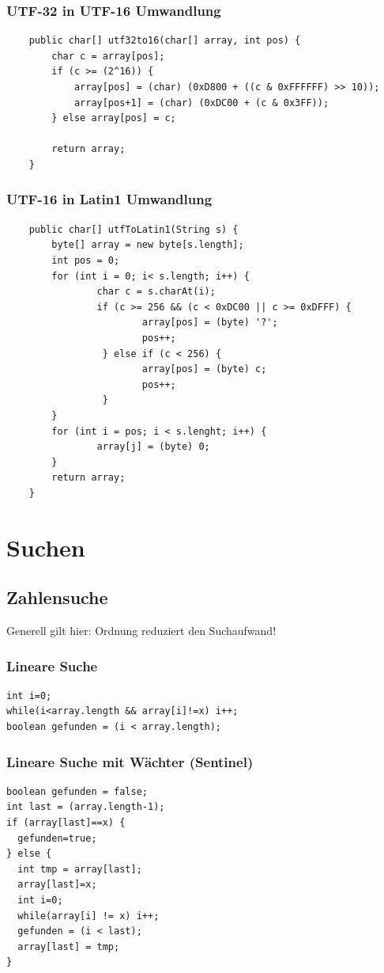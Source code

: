 \documentclass[a4paper,10pt]{article}
\begin{document}
\subsubsection{UTF-32 in UTF-16 Umwandlung}
\begin{lstlisting}
    public char[] utf32to16(char[] array, int pos) {
        char c = array[pos];
        if (c >= (2^16)) {
            array[pos] = (char) (0xD800 + ((c & 0xFFFFFF) >> 10));
            array[pos+1] = (char) (0xDC00 + (c & 0x3FF));
        } else array[pos] = c;
            
        return array;
    }
\end{lstlisting}

\subsubsection{UTF-16 in Latin1 Umwandlung}
\begin{lstlisting}
    public char[] utfToLatin1(String s) {
        byte[] array = new byte[s.length];
        int pos = 0;
        for (int i = 0; i< s.length; i++) {
        		char c = s.charAt(i);
        		if (c >= 256 && (c < 0xDC00 || c >= 0xDFFF) {
        				array[pos] = (byte) '?';
        				pos++;
        		 } else if (c < 256) {
        		 		array[pos] = (byte) c;
        		 		pos++;
        		 }
		}
		for (int i = pos; i < s.lenght; i++) {
				array[j] = (byte) 0;
		}        		
        return array;
    }
\end{lstlisting}

\newpage
\section{Suchen}

\subsection{Zahlensuche}
Generell gilt hier: Ordnung reduziert den Suchaufwand!

\subsubsection{Lineare Suche}
\begin{lstlisting}
int i=0;
while(i<array.length && array[i]!=x) i++;
boolean gefunden = (i < array.length);
\end{lstlisting}

\subsubsection{Lineare Suche mit W\"achter (Sentinel)}
\begin{lstlisting}
boolean gefunden = false;
int last = (array.length-1);
if (array[last]==x) {
  gefunden=true;
} else {
  int tmp = array[last];
  array[last]=x;
  int i=0;
  while(array[i] != x) i++;
  gefunden = (i < last);
  array[last] = tmp;
}
\end{lstlisting}
\end{document}
